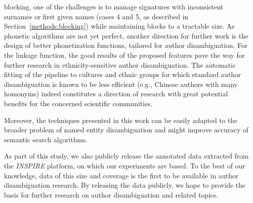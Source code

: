 \documentclass[runningheads,a4paper]{llncs}
\makeatletter
\newcommand*{\eg}{e.g.\@\xspace}
\newcommand{\verylongpage}{\enlargethispage{2\baselineskip}}
\makeatother
\begin{document}
blocking, one of the challenges is to manage signatures with inconsistent
surnames or first given names (cases 4 and 5, as described in
Section~\ref{methods:blocking}) while maintaining blocks to a tractable size.
As phonetic algorithms are not yet perfect, another direction  for further work is the design of better
phonetization functions, tailored for author disambiguation. For the linkage function,
the good results of the proposed features pave the way for further research  in
ethnicity-sensitive author disambiguation. The automatic fitting of the
pipeline to cultures and ethnic groups for which standard author disambiguation
is known to be less efficient (\eg, Chinese authors with many homonyms)  indeed
constitutes a direction of research with great potential benefits for the
concerned scientific communities.

Moreover, the techniques presented in this work can be easily adapted to the broader
problem of named entity disambiguation and might improve accuracy of semantic search
algorithms.

As part of this study, we also publicly release the annotated data extracted
from the \emph{INSPIRE} platform, on which our experiments are based.
To the best of our knowledge, data of this size and coverage is the first to be
available in author disambiguation research. By releasing the data publicly,
we hope to provide the basis for further research on author disambiguation
and related topics.

\verylongpage



\end{document}
